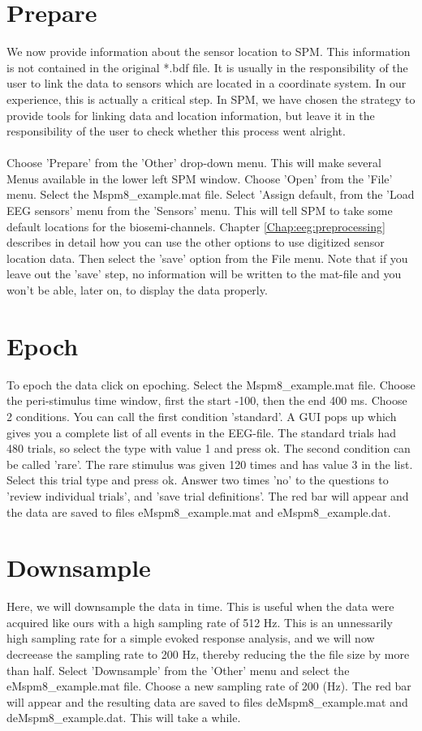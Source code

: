 \section{Prepare}
We now provide information about the sensor location to SPM. This information is not contained in the original *.bdf file. It is usually in the responsibility of the user to link the data to sensors which are located in a coordinate system. In our experience, this is actually a critical step. In SPM, we have chosen the strategy to provide tools for linking data and location information, but leave it in the responsibility of the user to check whether this process went alright. 
\\
\\
Choose 'Prepare' from the 'Other' drop-down menu. This will make several Menus available in the lower left SPM window. Choose 'Open' from the 'File' menu. Select the Mspm8\_example.mat file. Select 'Assign default, from the 'Load EEG sensors' menu from the 'Sensors' menu. This will tell SPM to take some default locations for the biosemi-channels. Chapter \ref{Chap:eeg:preprocessing} describes in detail how you can use the other options to use digitized sensor location data. Then select the 'save' option from the File menu. Note that if you leave out the 'save' step, no information will be written to the mat-file and you won't be able, later on, to display the data properly.


\section{Epoch}
To epoch the data click on epoching. Select the Mspm8\_example.mat file. Choose the peri-stimulus time window, first the start -100, then the end 400 ms. Choose 2 conditions. You can call the first condition 'standard'. A GUI pops up which gives you a complete list of all events in the EEG-file. The standard trials had 480 trials, so select the type with value 1 and press ok. The second condition can be called 'rare'. The rare stimulus was given 120 times and has value 3 in the list. Select this trial type and press ok. Answer two times 'no' to the questions to 'review individual trials', and 'save trial definitions'. The red bar will appear and the data are saved to files eMspm8\_example.mat and eMspm8\_example.dat.

\section{Downsample}
Here, we will downsample the data in time. This is useful when the data were acquired like ours with a high sampling rate of 512 Hz. This is an unnessarily high sampling rate for a simple evoked response analysis, and we will now decreease the sampling rate to 200 Hz, thereby reducing the the file size by more than half. Select 'Downsample' from the 'Other' menu and select the eMspm8\_example.mat file. Choose a new sampling rate of 200 (Hz). The red bar will appear and the resulting data are saved to files deMspm8\_example.mat and deMspm8\_example.dat. This will take a while.


